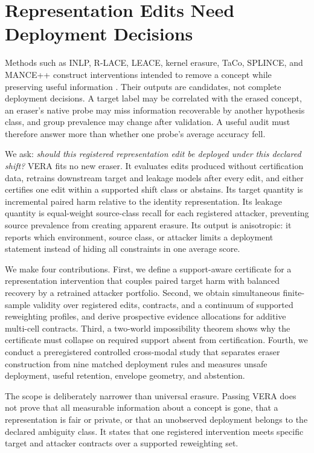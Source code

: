 \section{Representation Edits Need Deployment Decisions}
\label{iclr:sec:intro}

Methods such as INLP, R-LACE, LEACE, kernel erasure, TaCo, SPLINCE, and MANCE++
construct interventions intended to remove a concept while preserving useful
information
\cite{ravfogel2020null,ravfogel2022linear,belrose2023leace,ravfogel2022kernel,jourdan2023taco,holstege2025splince,avitan2026mance}.
Their outputs are candidates, not complete deployment decisions. A target label
may be correlated with the erased concept, an eraser's native probe may miss
information recoverable by another hypothesis class, and group prevalence may
change after validation. A useful audit must therefore answer more than whether
one probe's average accuracy fell.

We ask: \emph{should this registered representation edit be deployed under this
declared shift?} VERA fits no new eraser. It evaluates edits produced without
certification data, retrains downstream target and leakage models after every
edit, and either certifies one edit within a supported shift class or abstains.
Its target quantity is incremental paired harm relative to the identity
representation. Its leakage quantity is equal-weight source-class recall for
each registered attacker, preventing source prevalence from creating apparent
erasure. Its output is anisotropic: it reports which environment, source class,
or attacker limits a deployment statement instead of hiding all constraints in
one average score.

We make four contributions. First, we define a support-aware certificate for a
representation intervention that couples paired target harm with balanced
recovery by a retrained attacker portfolio. Second, we obtain simultaneous
finite-sample validity over registered edits, contracts, and a continuum of
supported reweighting profiles, and derive prospective evidence allocations
for additive multi-cell contracts. Third, a two-world impossibility theorem
shows why the certificate must collapse on required support absent from
certification. Fourth, we conduct a preregistered controlled cross-modal study that
separates eraser construction from nine matched deployment rules and measures
unsafe deployment, useful retention, envelope geometry, and abstention.

The scope is deliberately narrower than universal erasure. Passing VERA does
not prove that all measurable information about a concept is gone, that a
representation is fair or private, or that an unobserved deployment belongs to
the declared ambiguity class. It states that one registered intervention meets
specific target and attacker contracts over a supported reweighting set.

